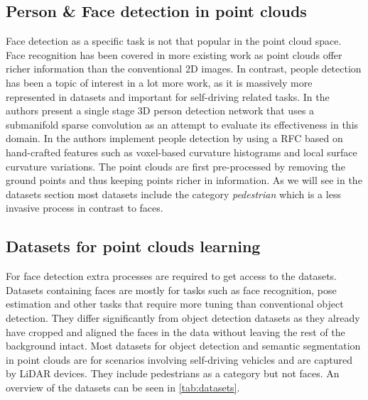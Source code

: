 \subsection{Person \& Face detection in point clouds}
Face detection as a specific task is not that popular in the point cloud space. Face recognition has been covered in more existing work as point clouds offer richer information than the conventional 2D images.
In contrast, people detection has been a topic of interest in a lot more work, as it is massively more represented in datasets and important for self-driving related tasks.
In \cite{jia_person-minkunet_2021} the authors present a single stage 3D person detection network that uses a submanifold sparse convolution as an attempt to evaluate its effectiveness in this domain.
In \cite{Belbachir_Ortiz_Aalerud_Belbachir_2025} the authors implement people detection by using a \ac{RFC} based on hand-crafted features such as voxel-based curvature histograms and local surface curvature variations.
The point clouds are first pre-processed by removing the ground points and thus keeping points richer in information.
As we will see in the datasets section most datasets include the category \emph{pedestrian} which is a less invasive process in contrast to faces.


\subsection{Datasets for point clouds learning}
For face detection extra processes are required to get
access to the datasets.
Datasets containing faces are mostly for tasks such as face recognition, pose estimation and other tasks that require more tuning than conventional object detection.
They differ significantly from object detection datasets as they already have cropped and aligned the faces in the data without leaving the rest of the background intact.
Most datasets for object detection and semantic segmentation in point clouds are for scenarios involving self-driving vehicles and are captured by LiDAR devices.
They include pedestrians as a category but not faces.
An overview of the datasets can be seen in \ref{tab:datasets}.

